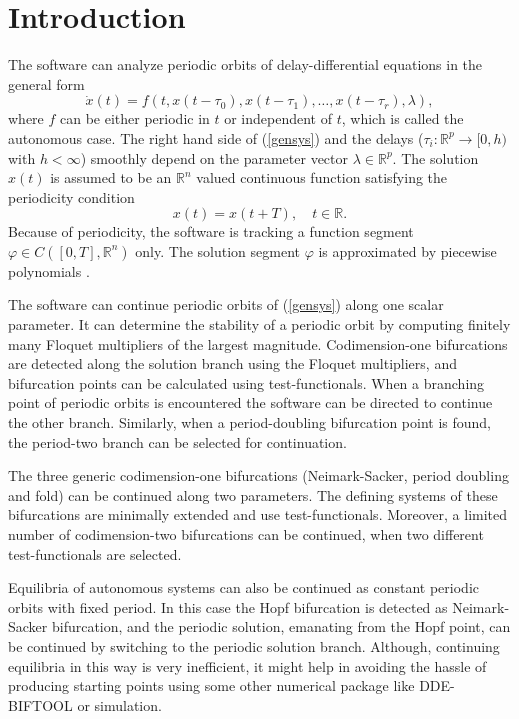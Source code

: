 \documentclass[10pt,a4paper]{ddedoc}
\begin{document}
\newpage

\tableofcontents

\newpage

\section{Introduction}

The software can analyze periodic orbits of delay-differential equations in the
general form
\begin{equation}
	\dot{x}(t) = f (t, x(t-\tau_0), x(t - \tau_1), \dots , x(t - \tau_r), \lambda
), \label{gensys}
\end{equation}
where $f$ can be either periodic in $t$ or independent of $t$, which is called
the autonomous case. The right hand side of (\ref{gensys}) and the delays
($\tau_i : \mathbb{R}^p \to [0,h)$ with $h<\infty$) smoothly depend on the
parameter vector $\lambda \in \mathbb{R}^p$. The solution $x(t)$ is assumed to
be an $\mathbb{R}^n$ valued continuous function satisfying the periodicity
condition
\[
	x(t) = x(t+T),\quad t \in \mathbb{R}.
\]
Because of periodicity, the software is tracking a function segment $\varphi \in
C([0,T],\mathbb{R}^n)$ only. The solution segment $\varphi$ is approximated by
piecewise polynomials \cite{engcol,engstab}.

The software can continue periodic orbits of (\ref{gensys}) along one scalar
parameter. It can determine the stability of a periodic orbit by computing
finitely many Floquet multipliers of the largest magnitude. Codimension-one
bifurcations are detected along the solution branch using the Floquet
multipliers, and bifurcation points can be calculated using test-functionals.
When a branching point of periodic orbits is encountered the software can be
directed to continue the other branch. Similarly, when a period-doubling
bifurcation point is found, the period-two branch can be selected for
continuation.

The three generic codimension-one bifurcations (Neimark-Sacker, period doubling
and fold) can be continued along two parameters. The defining systems of these
bifurcations are minimally extended and use test-functionals. Moreover, a
limited number of codimension-two bifurcations can be continued, when two
different test-functionals are selected.

Equilibria of autonomous systems can also be continued as constant periodic
orbits with fixed period. In this case the Hopf bifurcation is detected as
Neimark-Sacker bifurcation, and the periodic solution, emanating from the Hopf
point, can be continued by switching to the periodic solution branch.
Although, continuing equilibria in this way is very inefficient, it might help
in avoiding the hassle of producing starting points using some other numerical
package like DDE-BIFTOOL \cite{DDEBIF} or simulation.
\end{document}
